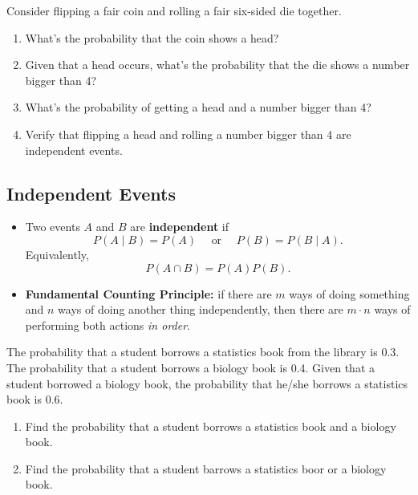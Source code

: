 \begin{example}

  Consider flipping a fair coin and rolling a fair six-sided die together.
  
  \begin{enumerate}
  \item
    What's the probability that the coin shows a head?
  \item
    Given that a head occurs, what's the probability that the die shows a
    number bigger than 4?
  \item
    What's the probability of getting a head and a number bigger than 4?
  \item
    Verify that flipping a head and rolling a number bigger than 4 are
    independent events.
  \end{enumerate}
  
  \end{example}

\hypertarget{independent-events}{%
\subsection{Independent Events}\label{independent-events}}

\begin{itemize}
\item
  Two events \(A\) and \(B\) are \textbf{independent} if \[
  P(A\mid B)=P(A)\quad \text{ or }
  \quad P(B)=P(B\mid A).
  \] Equivalently, \[
  P(A\cap B)=P(A)P(B).
  \]
\item
  \textbf{Fundamental Counting Principle:} if there are \(m\) ways of
  doing something and \(n\) ways of doing another thing independently,
  then there are \(m\cdot n\) ways of performing both actions \emph{in
  order}.
\end{itemize}



\begin{example}

The probability that a student borrows a statistics book from the
library is 0.3. The probability that a student borrows a biology book is
0.4. Given that a student borrowed a biology book, the probability that
he/she borrows a statistics book is 0.6.

\begin{enumerate}
\item
  Find the probability that a student borrows a statistics book and a
  biology book.
\item
  Find the probability that a student barrows a statistics boor or a
  biology book.
\end{enumerate}

\end{example}

